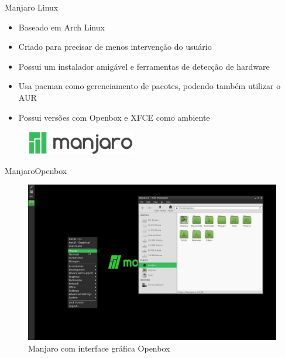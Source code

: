 \documentclass{beamer}
\begin{document}
\begin{frame}{Manjaro Linux}
    \begin{itemize}
        \item{Baseado em Arch Linux}
        \item{Criado para precisar de menos intervenção do usuário}
        \item{Possui um instalador amigável e ferramentas de detecção de hardware}
        \item{Usa pacman como gerenciamento de pacotes, podendo também utilizar o AUR}
        \item{Possui versões com Openbox e XFCE como ambiente}
    \end{itemize}
    \begin{figure}[h!]
        \centering
        \includegraphics[scale=0.80]{manjaro.png}
    \end{figure}
\end{frame}

\begin{frame}{Manjaro}{Openbox}
 \begin{figure}[h!]
        \centering
        \includegraphics[scale=0.27]{manjarobox.jpg}
        \caption{Manjaro com interface gráfica Openbox}
        \label{fig:Comando ls}
    \end{figure}
\end{frame}
\end{document}
